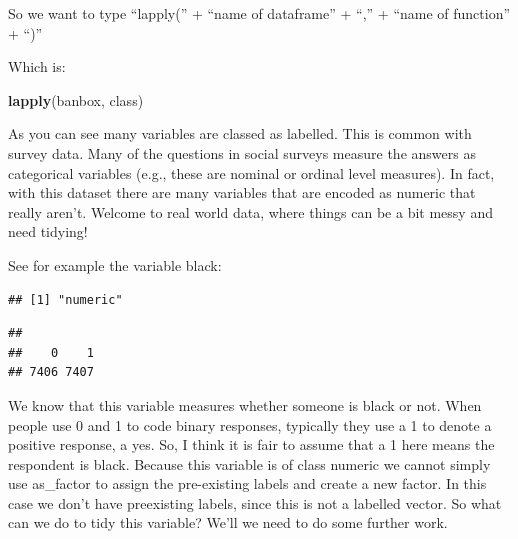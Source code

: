 \documentclass[]{book}
\newenvironment{Shaded}{\begin{snugshade}}{\end{snugshade}}
\newcommand{\KeywordTok}[1]{\textcolor[rgb]{0.13,0.29,0.53}{\textbf{#1}}}
\newcommand{\NormalTok}[1]{#1}
\newcommand{\OperatorTok}[1]{\textcolor[rgb]{0.81,0.36,0.00}{\textbf{#1}}}
\theoremstyle{definition}
\theoremstyle{definition}
\theoremstyle{definition}
\theoremstyle{remark}
\begin{document}
So we want to type ``lapply('' + ``name of dataframe'' + ``,'' + ``name
of function'' + ``)''

Which is:

\begin{Shaded}
\begin{Highlighting}[]
\KeywordTok{lapply}\NormalTok{(banbox, class)}
\end{Highlighting}
\end{Shaded}

As you can see many variables are classed as labelled. This is common
with survey data. Many of the questions in social surveys measure the
answers as categorical variables (e.g., these are nominal or ordinal
level measures). In fact, with this dataset there are many variables
that are encoded as numeric that really aren't. Welcome to real world
data, where things can be a bit messy and need tidying!

See for example the variable black:

\begin{Shaded}
\end{Shaded}

\begin{verbatim}
## [1] "numeric"
\end{verbatim}

\begin{Shaded}
\end{Shaded}

\begin{verbatim}
## 
##    0    1 
## 7406 7407
\end{verbatim}

We know that this variable measures whether someone is black or not.
When people use 0 and 1 to code binary responses, typically they use a 1
to denote a positive response, a yes. So, I think it is fair to assume
that a 1 here means the respondent is black. Because this variable is of
class numeric we cannot simply use as\_factor to assign the pre-existing
labels and create a new factor. In this case we don't have preexisting
labels, since this is not a labelled vector. So what can we do to tidy
this variable? We'll we need to do some further work.
\end{document}

